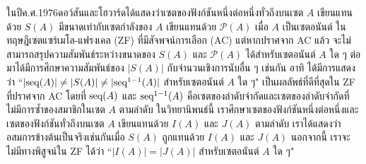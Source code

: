 \begin{thaiabstract}
ในปี\hspace{0.15cm}ค.ศ.\hspace{0.1cm}1976\hspace{0.2cm}ดอว์สันและโฮวาร์ดได้แสดงว่าเซตของฟังก์ชันหนึ่งต่อหนึ่งทั่วถึงบนเซต $A$ เขียนแทนด้วย $S(A)$ มีขนาดเท่ากับเซตกำลังของ $A$ เขียนแทนด้วย $\mathcal{P}(A)$ เมื่อ $A$ เป็นเซตอนันต์ ในทฤษฎีเซตแซร์เมโล-แฟรงเคล (ZF) ที่มีสัจพจน์การเลือก (AC) แต่หากปราศจาก AC แล้ว จะไม่สามารถสรุปความสัมพันธ์ระหว่างขนาดของ $S(A)$ และ $\mathcal{P}(A)$ ได้สำหรับเซตอนันต์ $A$ ใด ๆ ต่อมาได้มีการศึกษาความสัมพันธ์ของ $|S(A)|$ กับจำนวนเชิงการนับอื่น ๆ เช่นกัน อาทิ ได้มีการแสดงว่า ``$|\textup{seq}(A)|\neq|S(A)|\neq|\textup{seq}^{1-1}(A)|$ สำหรับเซตอนันต์ $A$ ใด ๆ" เป็นผลลัพธ์ที่ดีที่สุดใน ZF ที่ปราศจาก AC โดยที่ $\textup{seq}(A)$ และ $\textup{seq}^{1-1}(A)$ คือเซตของลำดับจำกัดและเซตของลำดับจำกัดที่ไม่มีการซ้ำของสมาชิกในเซต $A$ ตามลำดับ  ในวิทยานิพนธ์นี้ เราศึกษาเซตของฟังก์ชันหนึ่งต่อหนึ่งและเซตของฟังก์ชันทั่วถึงบนเซต $A$ เขียนแทนด้วย  $I(A)$ และ $J(A)$ ตามลำดับ เราได้แสดงว่า อสมการข้างต้นเป็นจริงเช่นกันเมื่อ $S(A)$ ถูกแทนด้วย $I(A)$ และ $J(A)$  นอกจากนี้ เราจะไม่มีทางพิสูจน์ใน ZF ได้ว่า ``$|I(A)|=|J(A)|$ สำหรับเซตอนันต์ $A$ ใด ๆ"

\end{thaiabstract}